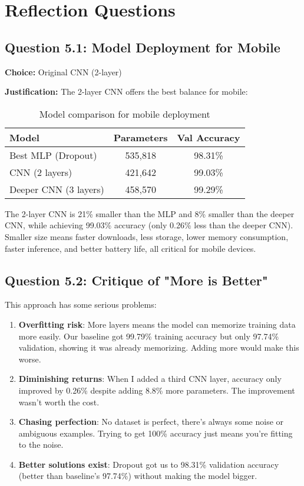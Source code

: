 \section{Reflection Questions}

\subsection{Question 5.1: Model Deployment for Mobile}

\textbf{Choice:} Original CNN (2-layer)

\textbf{Justification:} The 2-layer CNN offers the best balance for mobile:

\begin{table}[h]
\centering
\begin{tabular}{|l|c|c|}
\hline
\textbf{Model} & \textbf{Parameters} & \textbf{Val Accuracy} \\ \hline
Best MLP (Dropout) & 535,818 & 98.31\% \\ \hline
CNN (2 layers) & 421,642 & 99.03\% \\ \hline
Deeper CNN (3 layers) & 458,570 & 99.29\% \\ \hline
\end{tabular}
\caption{Model comparison for mobile deployment}
\end{table}

The 2-layer CNN is 21\% smaller than the MLP and 8\% smaller than the deeper CNN, while achieving 99.03\% accuracy (only 0.26\% less than the deeper CNN). Smaller size means faster downloads, less storage, lower memory consumption, faster inference, and better battery life, all critical for mobile devices.

\subsection{Question 5.2: Critique of "More is Better"}

This approach has some serious problems:

\begin{enumerate}
    \item \textbf{Overfitting risk}: More layers means the model can memorize training data more easily. Our baseline got 99.79\% training accuracy but only 97.74\% validation, showing it was already memorizing. Adding more would make this worse.
    
    \item \textbf{Diminishing returns}: When I added a third CNN layer, accuracy only improved by 0.26\% despite adding 8.8\% more parameters. The improvement wasn't worth the cost.
    
    \item \textbf{Chasing perfection}: No dataset is perfect, there's always some noise or ambiguous examples. Trying to get 100\% accuracy just means you're fitting to the noise.
    
    \item \textbf{Better solutions exist}: Dropout got us to 98.31\% validation accuracy (better than baseline's 97.74\%) without making the model bigger.
\end{enumerate}

